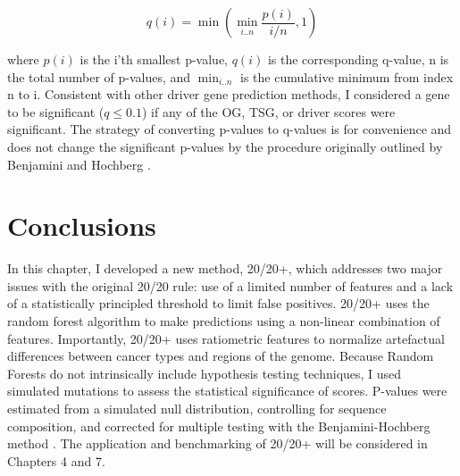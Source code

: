 \begin{equation}
q(i) = \min{\left(\min_{i..n}{\frac{p(i)}{i/n}}, 1 \right)}
\end{equation}

where $p(i)$ is the i'th smallest p-value, $q(i)$ is the corresponding q-value, n is the total number of p-values, and $\min_{i..n}$ is the cumulative minimum from index n to i. Consistent with other driver gene prediction methods, I considered a gene to be significant ($q \leq 0.1$) if any of the OG, TSG, or driver scores were significant. The strategy of converting p-values to q-values is for convenience and does not change the significant p-values by the procedure originally outlined by Benjamini and Hochberg \cite{RN94}.

\section{Conclusions}

In this chapter, I developed a new method, 20/20+, which addresses two major issues with the original 20/20 rule: use of a limited number of features and a lack of a statistically principled threshold to limit false positives. 20/20+ uses the random forest algorithm to make predictions using a non-linear combination of features. Importantly, 20/20+ uses ratiometric features to normalize artefactual differences between cancer types and regions of the genome. Because Random Forests do not intrinsically include hypothesis testing techniques, I used simulated mutations to assess the statistical significance of scores. P-values were estimated from a simulated null distribution, controlling for sequence composition, and corrected for multiple testing with the Benjamini-Hochberg method \cite{RN94}. The application and benchmarking of 20/20+ will be considered in Chapters 4 and 7.

